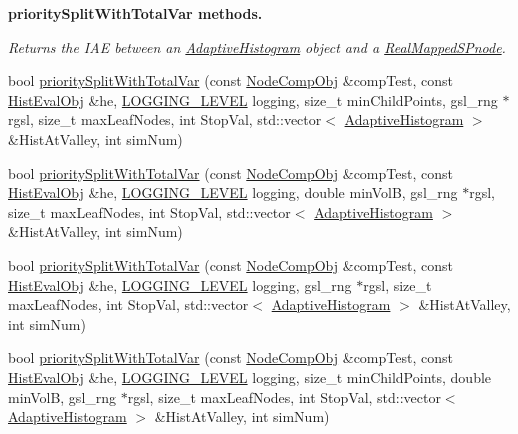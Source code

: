 \begin{Indent}{\bf priority\-Split\-With\-Total\-Var methods.}
\begin{DoxyCompactItemize}
\begin{DoxyCompactList}\small\item\em \-Returns the \-I\-A\-E between an \hyperlink{classsubpavings_1_1AdaptiveHistogram}{\-Adaptive\-Histogram} object and a \hyperlink{classsubpavings_1_1RealMappedSPnode}{\-Real\-Mapped\-S\-Pnode}. \end{DoxyCompactList}\item 
bool \hyperlink{classsubpavings_1_1AdaptiveHistogram_ae80f3d62957c9c70a2b7eed4b1e11810}{priority\-Split\-With\-Total\-Var} (const \hyperlink{classsubpavings_1_1NodeCompObj}{\-Node\-Comp\-Obj} \&comp\-Test, const \hyperlink{classsubpavings_1_1HistEvalObj}{\-Hist\-Eval\-Obj} \&he, \hyperlink{namespacesubpavings_aef8e51096b59ecaf1a1e9b2ee24b6089}{\-L\-O\-G\-G\-I\-N\-G\-\_\-\-L\-E\-V\-E\-L} logging, size\-\_\-t min\-Child\-Points, gsl\-\_\-rng $\ast$rgsl, size\-\_\-t max\-Leaf\-Nodes, int \-Stop\-Val, std\-::vector$<$ \hyperlink{classsubpavings_1_1AdaptiveHistogram}{\-Adaptive\-Histogram} $>$ \&\-Hist\-At\-Valley, int sim\-Num)
\item 
bool \hyperlink{classsubpavings_1_1AdaptiveHistogram_a508b13326647eaa46806ca7999d303f2}{priority\-Split\-With\-Total\-Var} (const \hyperlink{classsubpavings_1_1NodeCompObj}{\-Node\-Comp\-Obj} \&comp\-Test, const \hyperlink{classsubpavings_1_1HistEvalObj}{\-Hist\-Eval\-Obj} \&he, \hyperlink{namespacesubpavings_aef8e51096b59ecaf1a1e9b2ee24b6089}{\-L\-O\-G\-G\-I\-N\-G\-\_\-\-L\-E\-V\-E\-L} logging, double min\-Vol\-B, gsl\-\_\-rng $\ast$rgsl, size\-\_\-t max\-Leaf\-Nodes, int \-Stop\-Val, std\-::vector$<$ \hyperlink{classsubpavings_1_1AdaptiveHistogram}{\-Adaptive\-Histogram} $>$ \&\-Hist\-At\-Valley, int sim\-Num)
\item 
bool \hyperlink{classsubpavings_1_1AdaptiveHistogram_a39888154b396a7eb5fd6be1ff200a414}{priority\-Split\-With\-Total\-Var} (const \hyperlink{classsubpavings_1_1NodeCompObj}{\-Node\-Comp\-Obj} \&comp\-Test, const \hyperlink{classsubpavings_1_1HistEvalObj}{\-Hist\-Eval\-Obj} \&he, \hyperlink{namespacesubpavings_aef8e51096b59ecaf1a1e9b2ee24b6089}{\-L\-O\-G\-G\-I\-N\-G\-\_\-\-L\-E\-V\-E\-L} logging, gsl\-\_\-rng $\ast$rgsl, size\-\_\-t max\-Leaf\-Nodes, int \-Stop\-Val, std\-::vector$<$ \hyperlink{classsubpavings_1_1AdaptiveHistogram}{\-Adaptive\-Histogram} $>$ \&\-Hist\-At\-Valley, int sim\-Num)
\item 
bool \hyperlink{classsubpavings_1_1AdaptiveHistogram_acab027b9f4718b0ba077b142375a05cb}{priority\-Split\-With\-Total\-Var} (const \hyperlink{classsubpavings_1_1NodeCompObj}{\-Node\-Comp\-Obj} \&comp\-Test, const \hyperlink{classsubpavings_1_1HistEvalObj}{\-Hist\-Eval\-Obj} \&he, \hyperlink{namespacesubpavings_aef8e51096b59ecaf1a1e9b2ee24b6089}{\-L\-O\-G\-G\-I\-N\-G\-\_\-\-L\-E\-V\-E\-L} logging, size\-\_\-t min\-Child\-Points, double min\-Vol\-B, gsl\-\_\-rng $\ast$rgsl, size\-\_\-t max\-Leaf\-Nodes, int \-Stop\-Val, std\-::vector$<$ \hyperlink{classsubpavings_1_1AdaptiveHistogram}{\-Adaptive\-Histogram} $>$ \&\-Hist\-At\-Valley, int sim\-Num)
\end{DoxyCompactItemize}
\end{Indent}

